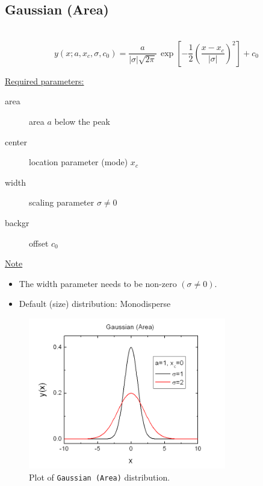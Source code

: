 \clearpage
\subsection{Gaussian (Area)} ~\\
\label{sec:GaussianNormalArea}
\begin{equation}
y(x;a,x_c,\sigma,c_0) = \frac{a}{|\sigma|\sqrt{2\pi}} \,
\exp\left[-\frac{1}{2}\left(\frac{x-x_c}{|\sigma|}\right)^2\right]
+c_0
\end{equation}
\vspace{5mm}

\uline{Required parameters:}
\begin{description}
    \item[area] area $a$ below the peak
    \item[center] location parameter (mode) $x_c$
    \item[width] scaling parameter $\sigma \neq 0$
    \item[backgr] offset $c_0$
\end{description}

\uline{Note}
\begin{itemize}
  \item The width parameter needs to be non-zero $(\sigma\neq 0)$.
  \item Default (size) distribution: Monodisperse
\end{itemize}
\begin{figure}[htb]
\begin{center}
\includegraphics[width=0.768\textwidth]{GaussianArea.png}
\end{center}
\caption{Plot of \texttt{Gaussian (Area)} distribution.}
\label{fig:GaussianArea}
\end{figure}


